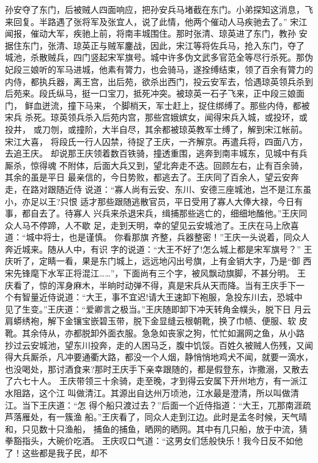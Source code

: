 孙安夺了东门，后被贼人四面响应，把孙安兵马堵截在东门。小弟探知这消息，飞
来回复。半路遇了张将军及张宜人，说了此情，他两个催动人马疾驰去了。”
宋江闻报，催动大军，疾驰上前，将南丰城围住。那时张清、琼英进了东门，教孙
安据住东门，张清、琼英正与贼军鏖战，因此，宋江等将佐兵马，抢入东门，夺了
城池，杀散贼兵，四门竖起宋军旗号。城中许多伪文武多官范全等尽行杀死。那伪
妃段三娘听的军马进城，他素有膂力，也会骑马，遂拴缚结束，领了百余有膂力的
内侍，都执兵器，离王宫，出后苑，欲杀出西门，投云安军去，恰遇琼英领兵杀到
后苑来。段氏纵马，挺一口宝刀，抵死冲突。被琼英一石子飞来，正中段三娘面门，
鲜血迸流，撞下马来，个脚梢天，军士赶上，捉住绑缚了。那些内侍，都被宋兵
杀死。琼英领兵杀入后苑内宫，那些宫娥嫔女，闻得宋兵入城，或投环，或投井，
或刀刎，或撞阶，大半自尽，其余都被琼英教军士缚了，解到宋江帐前。宋江大喜，
将段氏一行人囚禁，待捉了王庆，一齐解京。再遣兵将，四面八方，去追王庆。
却说那王庆领着数百铁骑，撞透重围，逃奔到南丰城东，见城中有兵厮杀，惊得魂
不附体，后面大兵又到，望北奔走不迭。回顾左右，止有百余骑，其余的虽是平日
最亲信的，今日势败，都逃去了。王庆同了百余人，望云安奔走，在路对跟随近侍
说道：“寡人尚有云安、东川、安德三座城池，岂不是江东虽小，亦足以王?只恨
适才那些跟随逃散官员，平日受用了寡人大俸大禄，今日有事，都自去了。待寡人
兴兵来杀退宋兵，缉捕那些逃亡的，细细地醢他。”王庆同众人马不停蹄，人不歇
足，走到天明，幸的望见云安城池了。王庆在马上欣喜道：“城中将士，也是谨慎。
你看那旗齐整，兵器整密！”王庆一头说着，同众人奔近城来。随从人中，有识
字的说道：“大王不好了!怎么城上都是宋军旗号？”
王庆听了，定睛一看，果是东门城上，远远地闪出号旗，上有金销大字，乃是“御
西宋先锋麾下水军正将混江……”，下面尚有三个字，被风飘动旗脚，不甚分明。
王庆看了，惊的浑身麻木，半晌时动弹不得，真是宋兵从天而降。当有王庆手下一
个有智量近侍说道：“大王，事不宜迟!请大王速卸下袍服，急投东川去，恐城中
见了生变。”王庆道：“爱卿言之极当。”王庆随即卸下冲天转角金幞头，脱下日
月云肩蟒绣袍，解下金镶宝嵌碧玉带，脱下金显缝云根朝靴，换了巾帻、便服、软
皮靴。其余侍从，亦都脱卸外面衣服。急急如丧家之狗，忙忙如漏网之鱼，从小路
抄过云安城池，望东川投奔，走的人困马乏，腹中饥馁。百姓久被贼人伤残，又闻
得大兵厮杀，凡冲要通衢大路，都没一个人烟，静悄悄地鸡犬不闻，就要一滴水，
也没喝处，那讨酒食来?那时王庆手下亲幸跟随的，都是假登东，诈撒溺，又散去
了六七十人。
王庆带领三十余骑，走至晚，才到得云安属下开州地方，有一派江水阻路，这个江
叫做清江。其源出自达州万顷池，江水最是澄清，所以叫做清江。当下王庆道：“怎
得个船只渡过去？”后面一个近侍指道：“大王，兀那南涯疏芦落雁处，有一簇渔
船。”王庆看了，同众人走到江边。此时是孟冬时候，天气晴和，只见数十只渔船，
捕鱼的捕鱼，晒网的晒网。其中有几只船，放于中流，猜拳豁指头，大碗价吃酒。
王庆叹口气道：“这男女们恁般快乐！我今日反不如他了！这些都是我子民，却不
